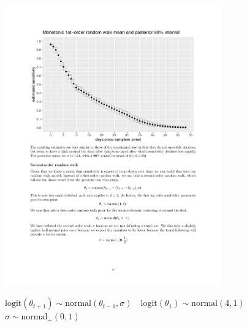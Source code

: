 \documentclass[9pt]{report}
\begin{document}
\includegraphics[width=0.7\textwidth]{img/monotonic-bayes-rw1.pdf}
\vspace*{-3pt}
\begin{subitemize}
\item $\textrm{logit}(\theta_{t+1}) \sim \textrm{normal}(\theta_{t-1}, 
  \sigma) 
  \quad \textrm{logit}(\theta_1) \sim \textrm{normal}(4, 1)$
  \\
  $\sigma \sim \textrm{normal}_+(0, 1)$
\end{subitemize}

  
\end{document}
